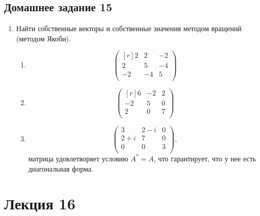 \documentclass[12pt]{article}
\begin{document}
	\subsection{Домашнее задание 15}\begin{enumerate}
		\item Найти собственные векторы и собственные значения методом вращений (методом Якоби).
		\begin{enumerate}
			\item \[\begin{pmatrix}[r]
			2 & 2 & -2\\
			2 & 5 & -4\\
			-2 & -4 & 5\\
			\end{pmatrix}\]
			\item \[\begin{pmatrix}[r]
			6 & -2 & 2\\
			-2 & 5 & 0\\
			2 & 0 & 7\\
			\end{pmatrix}\]
			\item \[\begin{pmatrix}
			3 & 2-i & 0\\
			2+i & 7 & 0\\
			0 & 0 & 3\\
			\end{pmatrix},\] матрица удовлетворяет условию $A^*=A$, что гарантирует, что у нее есть диагональная форма.
		\end{enumerate}
	\end{enumerate}
	
	\newpage
	\section{Лекция 16}
\end{document}
